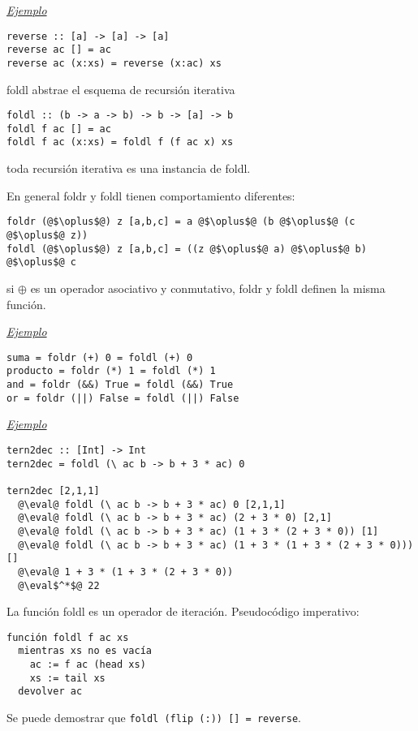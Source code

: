 \documentclass[12pt]{extarticle}
\makeatletter
\newcommand\subsubsubsection{\@startsection{paragraph}{4}{\z@}{-2.5ex\@plus -1ex \@minus -.25ex}{1.25ex \@plus .25ex}{\normalfont\normalsize\bfseries}}
\def\ejemplo{\textit{\underline{Ejemplo} }}
\def\eval{$\rightsquigarrow$}
\newcommand\hsline[1]{\texttt{#1}}
\makeatother
\begin{document}
\ejemplo
\begin{verbatim}
reverse :: [a] -> [a] -> [a]
reverse ac [] = ac
reverse ac (x:xs) = reverse (x:ac) xs
\end{verbatim}

foldl abstrae el esquema de recursión iterativa
\begin{verbatim}
foldl :: (b -> a -> b) -> b -> [a] -> b
foldl f ac [] = ac
foldl f ac (x:xs) = foldl f (f ac x) xs
\end{verbatim}
toda recursión iterativa es una instancia de foldl.

En general foldr y foldl tienen comportamiento diferentes:
\begin{verbatim}
foldr (@$\oplus$@) z [a,b,c] = a @$\oplus$@ (b @$\oplus$@ (c @$\oplus$@ z))
foldl (@$\oplus$@) z [a,b,c] = ((z @$\oplus$@ a) @$\oplus$@ b) @$\oplus$@ c
\end{verbatim}

si $\oplus$ es un operador asociativo y conmutativo, foldr y foldl definen la misma función.

\ejemplo
\begin{verbatim}
suma = foldr (+) 0 = foldl (+) 0
producto = foldr (*) 1 = foldl (*) 1
and = foldr (&&) True = foldl (&&) True
or = foldr (||) False = foldl (||) False
\end{verbatim}

\ejemplo
\begin{verbatim}
tern2dec :: [Int] -> Int
tern2dec = foldl (\ ac b -> b + 3 * ac) 0

tern2dec [2,1,1]
  @\eval@ foldl (\ ac b -> b + 3 * ac) 0 [2,1,1]
  @\eval@ foldl (\ ac b -> b + 3 * ac) (2 + 3 * 0) [2,1]
  @\eval@ foldl (\ ac b -> b + 3 * ac) (1 + 3 * (2 + 3 * 0)) [1]
  @\eval@ foldl (\ ac b -> b + 3 * ac) (1 + 3 * (1 + 3 * (2 + 3 * 0))) []
  @\eval@ 1 + 3 * (1 + 3 * (2 + 3 * 0))
  @\eval$^*$@ 22 
\end{verbatim}

La función foldl es un operador de iteración.
Pseudocódigo imperativo:

\begin{verbatim}
función foldl f ac xs
  mientras xs no es vacía
    ac := f ac (head xs)
    xs := tail xs
  devolver ac
\end{verbatim}

Se puede demostrar que \hsline{foldl (flip (:)) [] = reverse}.

\subsubsubsection{Ejercicios}
\end{document}
